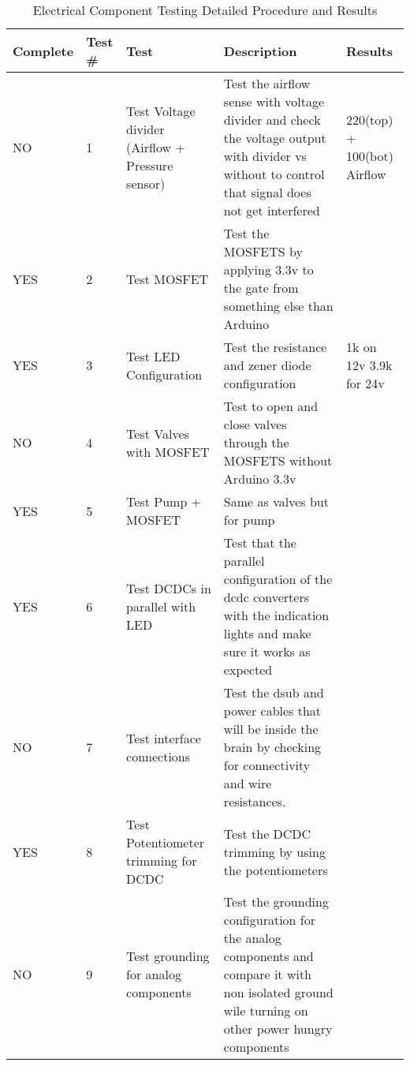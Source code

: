 \begin{table}[H]
\begin{tabular}{|l|l|l|l|l|}
\hline
Complete & Test \# & Test & Description & Results \\ \hline
NO & 1 & Test Voltage divider (Airflow + Pressure sensor) & Test the airflow sense with voltage divider and check the voltage output with divider vs without to control that signal does not get interfered & 220(top) + 100(bot) Airflow \\ \hline
YES & 2 & Test MOSFET & Test the MOSFETS by applying 3.3v to the gate from something else than Arduino &  \\ \hline
YES & 3 & Test LED Configuration & Test the resistance and zener diode configuration & 1k on 12v  3.9k for 24v \\ \hline
NO & 4 & Test Valves with MOSFET & Test to open and close valves through the MOSFETS without Arduino 3.3v &  \\ \hline
YES & 5 & Test Pump + MOSFET & Same as valves but for pump &  \\ \hline
YES & 6 & Test DCDCs in parallel with LED & Test that the parallel configuration of the dcdc converters with the indication lights and make sure it works as expected &  \\ \hline
NO & 7 & Test interface connections & Test the dsub and power cables that will be inside the brain by checking for connectivity and wire resistances. &  \\ \hline
YES & 8 & Test Potentiometer trimming for DCDC & Test the DCDC trimming by using the potentiometers &  \\ \hline
NO & 9 & Test grounding for analog components & Test the grounding configuration for the analog components and compare it with non isolated ground wile turning on other power hungry components &  \\ \hline
\end{tabular}
\caption{Electrical Component Testing Detailed Procedure and Results}
\label{tab:test33-result-electrical-component}
\end{table}